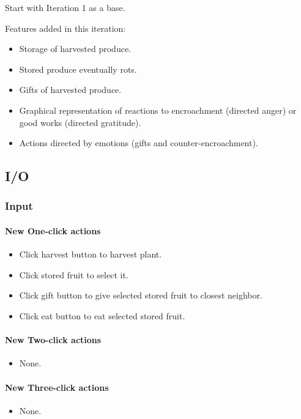\documentclass[12pt]{article}
\begin{document}
Start with Iteration 1 as a base.

Features added in this iteration:
\begin{itemize}
\item Storage of harvested produce.
\item Stored produce eventually rots.
\item Gifts of harvested produce.
\item Graphical representation of reactions to encroachment (directed anger) or good works (directed gratitude).
\item Actions directed by emotions (gifts and counter-encroachment).
\end{itemize}

\subsection{I/O}

\subsubsection{Input}

\paragraph{New One-click actions}
\begin{itemize}
\item Click harvest button to harvest plant.
\item Click stored fruit to select it.
\item Click gift button to give selected stored fruit to closest neighbor.
\item Click eat button to eat selected stored fruit.
\end{itemize}

\paragraph{New Two-click actions}
\begin{itemize}
\item None.
\end{itemize}

\paragraph{New Three-click actions}
\begin{itemize}
\item None.
\end{itemize}
\end{document}
